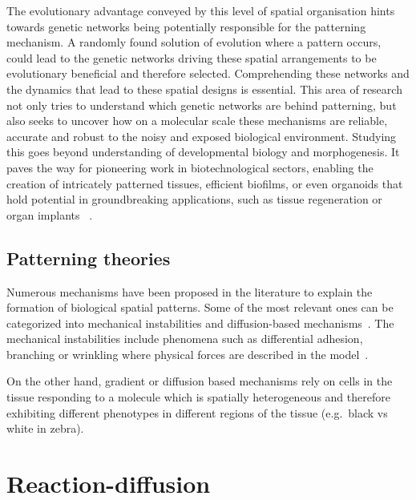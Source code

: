 The evolutionary advantage conveyed by this level of spatial organisation  hints towards genetic networks being potentially responsible for the patterning mechanism.
A randomly found solution of evolution where a pattern occurs, could lead to the genetic networks driving these spatial arrangements to be evolutionary beneficial and therefore selected.
Comprehending these networks and the dynamics that lead to these spatial designs is essential.
This area of research not only tries to understand which genetic networks are behind patterning, but also seeks to uncover how on a molecular scale these mechanisms are reliable, accurate and robust to the noisy and exposed biological environment.
Studying this goes beyond understanding of developmental biology and morphogenesis.
It paves the way for pioneering work in biotechnological sectors, enabling the creation of intricately patterned tissues, efficient biofilms, or even organoids that hold potential in groundbreaking applications, such as tissue regeneration or organ implants ~\parencite{Scholes2017,Tan2018}.



\subsection{Patterning theories}
Numerous mechanisms have been proposed in the literature to explain the formation of biological spatial patterns.
Some of the most relevant ones can be categorized into mechanical instabilities and diffusion-based mechanisms~\parencite{kosmrlj2020_2}.
The mechanical instabilities include phenomena such as differential adhesion, branching or wrinkling where physical forces are described in the model~\parencite{Scholes2017}.

On the other hand, gradient or diffusion based mechanisms rely on cells in the tissue responding to a molecule which is spatially heterogeneous and therefore exhibiting different phenotypes in different regions of the tissue (e.g.\ black vs white in zebra).


\section{Reaction-diffusion}
